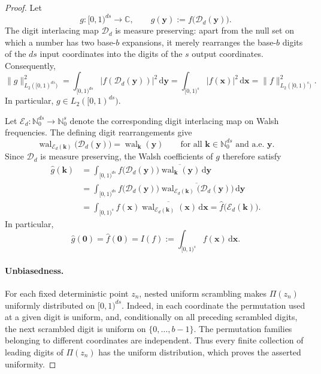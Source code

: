 \documentclass[11pt]{article}
\newcommand{\Nzero}{\mathbb N_0}
\newcommand{\D}{\mathcal D}
\newcommand{\E}{\mathcal E}
\newcommand{\wal}{\operatorname{wal}}
\begin{document}
\begin{proof}
Let
\[
  g:[0,1)^{ds}\to\mathbb C,
  \qquad
  g(\boldsymbol y):=f\bigl(\D_d(\boldsymbol y)\bigr).
\]
The digit interlacing map \(\D_d\) is measure preserving: apart from the
null set on which a number has two base-\(b\) expansions, it merely
rearranges the base-\(b\) digits of the \(ds\) input coordinates into the
digits of the \(s\) output coordinates.  Consequently,
\[
  \lVert g\rVert_{L_2([0,1)^{ds})}^2
  =\int_{[0,1)^{ds}}
       \bigl|f(\D_d(\boldsymbol y))\bigr|^2\,\mathrm d\boldsymbol y
  =\int_{[0,1)^s}|f(\boldsymbol x)|^2\,\mathrm d\boldsymbol x
  =\lVert f\rVert_{L_2([0,1)^s)}^2.
\]
In particular, \(g\in L_2([0,1)^{ds})\).

Let
\(\E_d:\Nzero^{ds}\to\Nzero^s\)
denote the corresponding digit interlacing map on Walsh frequencies.
The defining digit rearrangements give
\[
  \wal_{\E_d(\boldsymbol k)}\bigl(\D_d(\boldsymbol y)\bigr)
  =\wal_{\boldsymbol k}(\boldsymbol y)
  \qquad
  \text{for all \(\boldsymbol k\in\Nzero^{ds}\) and a.e. \(\boldsymbol y\).}
\]
Since \(\D_d\) is measure preserving, the Walsh coefficients of \(g\)
therefore satisfy
\[
\begin{aligned}
  \widehat g(\boldsymbol k)
  &=\int_{[0,1)^{ds}}
       f\bigl(\D_d(\boldsymbol y)\bigr)
       \overline{\wal_{\boldsymbol k}(\boldsymbol y)}
       \,\mathrm d\boldsymbol y \\
  &=\int_{[0,1)^{ds}}
       f\bigl(\D_d(\boldsymbol y)\bigr)
       \overline{
         \wal_{\E_d(\boldsymbol k)}
         \bigl(\D_d(\boldsymbol y)\bigr)
       }
       \,\mathrm d\boldsymbol y \\
  &=\int_{[0,1)^s}
       f(\boldsymbol x)
       \overline{\wal_{\E_d(\boldsymbol k)}(\boldsymbol x)}
       \,\mathrm d\boldsymbol x
   =\widehat f\bigl(\E_d(\boldsymbol k)\bigr).
\end{aligned}
\]
In particular,
\[
  \widehat g(\boldsymbol0)
  =\widehat f(\boldsymbol0)
  =I(f):=\int_{[0,1)^s}f(\boldsymbol x)\,\mathrm d\boldsymbol x.
\]

\paragraph{Unbiasedness.}
For each fixed deterministic point \(z_n\), nested uniform scrambling
makes \(\Pi(z_n)\) uniformly distributed on \([0,1)^{ds}\).  Indeed, in
each coordinate the permutation used at a given digit is uniform, and,
conditionally on all preceding scrambled digits, the next scrambled digit
is uniform on \(\{0,\ldots,b-1\}\).  The permutation families belonging to
different coordinates are independent.  Thus every finite collection of
leading digits of \(\Pi(z_n)\) has the uniform distribution, which proves
the asserted uniformity.


\end{proof}
\end{document}

